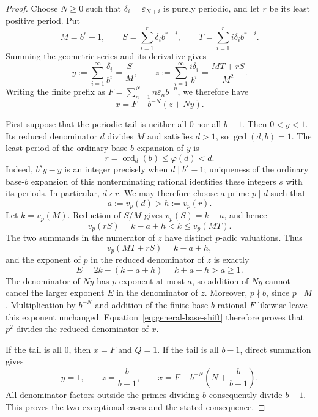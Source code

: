\documentclass[11pt]{article}
\theoremstyle{definition}
\theoremstyle{remark}
\begin{document}
\begin{proof}
Choose $N\geq0$ such that $\delta_i=\varepsilon_{N+i}$ is purely
periodic, and let $r$ be its least positive period.  Put
\[
 M=b^r-1,\qquad
 S=\sum_{i=1}^{r}\delta_i b^{r-i},\qquad
 T=\sum_{i=1}^{r}i\delta_i b^{r-i}.
\]
Summing the geometric series and its derivative gives
\begin{equation}\label{eq:general-base-periodic-tail}
 y:=\sum_{i=1}^{\infty}\frac{\delta_i}{b^i}=\frac{S}{M},
 \qquad
 z:=\sum_{i=1}^{\infty}\frac{i\delta_i}{b^i}
     =\frac{MT+rS}{M^2}.
\end{equation}
Writing the finite prefix as
$F=\sum_{n=1}^{N}n\varepsilon_n b^{-n}$, we therefore have
\begin{equation}\label{eq:general-base-shift}
 x=F+b^{-N}(z+Ny).
\end{equation}

First suppose that the periodic tail is neither all $0$ nor all $b-1$.
Then $0<y<1$.  Its reduced denominator $d$ divides $M$ and satisfies
$d>1$, so $\gcd(d,b)=1$.  The least period of the ordinary base-$b$
expansion of $y$ is
\[
 r=\operatorname{ord}_d(b)\leq\varphi(d)<d.
\]
Indeed, $b^s y-y$ is an integer precisely when $d\mid b^s-1$;
uniqueness of the ordinary base-$b$ expansion of this nonterminating
rational identifies these integers $s$ with its periods.  In particular,
$d\nmid r$.  We may therefore choose a prime $p\mid d$ such that
\[
 a:=v_p(d)>h:=v_p(r).
\]
Let $k=v_p(M)$.  Reduction of $S/M$ gives $v_p(S)=k-a$, and hence
\[
 v_p(rS)=k-a+h<k\leq v_p(MT).
\]
The two summands in the numerator of $z$ have distinct $p$-adic
valuations.  Thus
\[
 v_p(MT+rS)=k-a+h,
\]
and the exponent of $p$ in the reduced denominator of $z$ is exactly
\[
 E=2k-(k-a+h)=k+a-h>a\geq1.
\]
The denominator of $Ny$ has $p$-exponent at most $a$, so addition of
$Ny$ cannot cancel the larger exponent $E$ in the denominator of $z$.
Moreover, $p\nmid b$, since $p\mid M$.  Multiplication by $b^{-N}$ and
addition of the finite base-$b$ rational $F$ likewise leave this exponent
unchanged.  Equation~\eqref{eq:general-base-shift} therefore proves that
$p^2$ divides the reduced denominator of $x$.

If the tail is all $0$, then $x=F$ and $Q=1$.  If the tail is all
$b-1$, direct summation gives
\[
 y=1,\qquad z=\frac{b}{b-1},\qquad
 x=F+b^{-N}\left(N+\frac{b}{b-1}\right).
\]
All denominator factors outside the primes dividing $b$ consequently
divide $b-1$.  This proves the two exceptional cases and the stated
consequence.
\end{proof}
\end{document}
